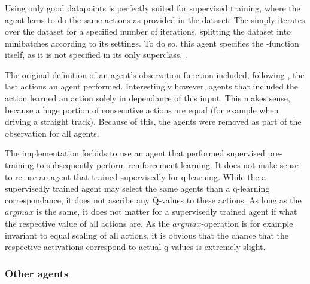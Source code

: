 \subsubsection{}

Using only good datapoints is perfectly suited for supervised training, where the agent lerns to do the same actions as provided in the dataset. The  simply iterates over the dataset for a specified number of iterations, splitting the dataset into minibatches according to its settings. To do so, this agent specifies the -function itself, as it is not specified in its only superclass, .

The original definition of an agent's observation-function included, following \cite{mnih_human-level_2015}, the last actions an agent performed. Interestingly however, agents that included the action learned an action solely in dependance of this input. This makes sense, because a huge portion of consecutive actions are equal (for example when driving a straight track). Because of this, the agents were removed as part of the observation for all agents.

The implementation forbids to use an agent that performed supervised pre-training to subsequently perform reinforcement learning. It does not make sense to re-use an agent that trained supervisedly for q-learning. While the a supervisedly trained agent may select the same agents than a q-learning correspondance, it does not ascribe any Q-values to these actions. As long as the $argmax$ is the same, it does not matter for a supervisedly trained agent if what the respective value of all actions are. As the $argmax$-operation is for example invariant to equal scaling of all actions, it is obvious that the chance that the respective activations correspond to actual q-values is extremely slight.

\subsubsection{Other agents}

